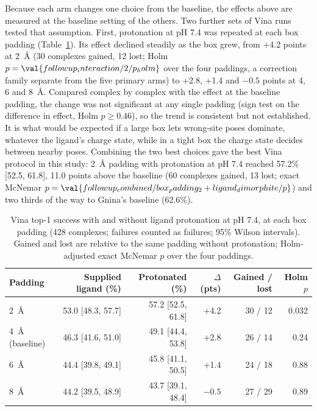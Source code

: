 Because each arm changes one choice from the baseline, the effects above are measured at
the baseline setting of the others. Two further sets of Vina runs tested that assumption.
First, protonation at pH 7.4 was repeated at each box padding (Table~\ref{tab:interaction}).
Its effect declined steadily as the box grew, from +4.2 points at \SI{2}{\angstrom} (30
complexes gained, 12 lost; Holm $p = \val{followup_interaction/2/p_holm}$ over the four paddings, a correction family
separate from the five primary arms) to +2.8, +1.4 and
$-0.5$ points at 4, 6 and \SI{8}{\angstrom}. Compared complex by complex with the effect at
the baseline padding, the change was not significant at any single padding (sign test on
the difference in effect, Holm $p \ge 0.46$), so the trend is consistent but not
established. It is what would be expected if a large box lets wrong-site poses dominate,
whatever the ligand's charge state, while in a tight box the charge state decides between
nearby poses. Combining the two best choices gave the best Vina protocol in this study:
\SI{2}{\angstrom} padding with protonation at pH 7.4 reached 57.2\% [52.5, 61.8], 11.0
points above the baseline (60 complexes gained, 13 lost; exact McNemar
$p = \val{followup_combined/box_padding_2+ligand_dimorphite/p}$) and two thirds of the way to Gnina's baseline (62.6\%).

\begin{table}[h]
  \centering
  \caption{Vina top-1 success with and without ligand protonation at pH 7.4, at each box
    padding (428 complexes; failures counted as failures; 95\% Wilson intervals). Gained
    and lost are relative to the same padding without protonation; Holm-adjusted exact
    McNemar $p$ over the four paddings.}
  \label{tab:interaction}
  \begin{tabular}{lrrrrr}
    \toprule
    Padding & Supplied ligand (\%) & Protonated (\%) & $\Delta$ (pts) & Gained / lost & Holm $p$ \\
    \midrule
    \SI{2}{\angstrom} & 53.0 [48.3, 57.7] & 57.2 [52.5, 61.8] & +4.2 & 30 / 12 & 0.032 \\
    \SI{4}{\angstrom} (baseline) & 46.3 [41.6, 51.0] & 49.1 [44.4, 53.8] & +2.8 & 26 / 14 & 0.24 \\
    \SI{6}{\angstrom} & 44.4 [39.8, 49.1] & 45.8 [41.1, 50.5] & +1.4 & 24 / 18 & 0.88 \\
    \SI{8}{\angstrom} & 44.2 [39.5, 48.9] & 43.7 [39.1, 48.4] & $-0.5$ & 27 / 29 & 0.89 \\
    \bottomrule
  \end{tabular}
\end{table}

